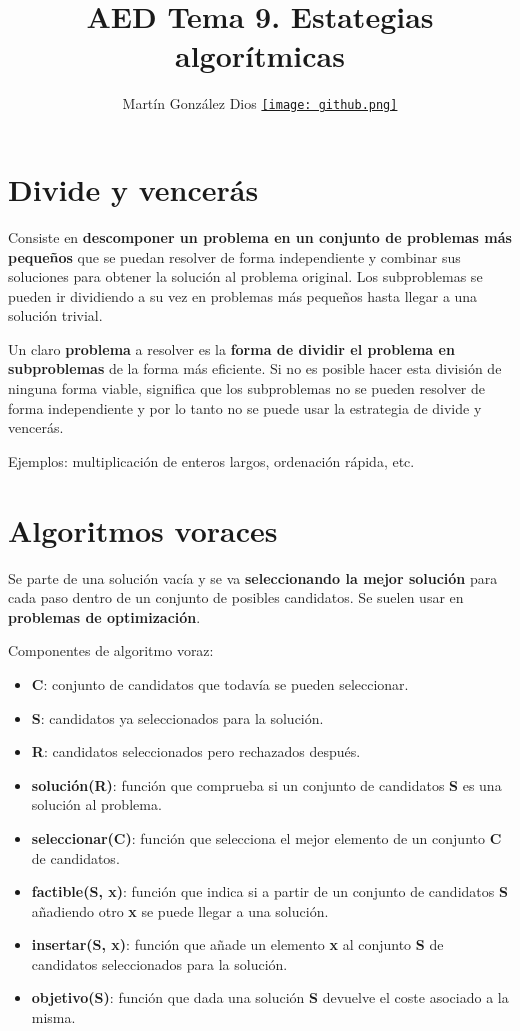 \documentclass{article}
\title{AED Tema 9. Estategias algorítmicas}
\author{Martín González Dios 
\href{https://github.com/martindios}{\texttt{[image: github.png]}}}
\begin{document}
\maketitle

\section{Divide y vencerás}
Consiste en \textbf{descomponer un problema en un conjunto de problemas más pequeños} que se puedan resolver de forma independiente y combinar sus soluciones para obtener la solución al problema original. Los subproblemas se pueden ir dividiendo a su vez en problemas más pequeños hasta llegar a una solución trivial.

Un claro \textbf{problema} a resolver es la \textbf{forma de dividir el problema en subproblemas} de la forma más eficiente. Si no es posible hacer esta división de ninguna forma viable, significa que los subproblemas no se pueden resolver de forma independiente y por lo tanto no se puede usar la
estrategia de divide y vencerás.

Ejemplos: multiplicación de enteros largos, ordenación rápida, etc.

\section{Algoritmos voraces}
Se parte de una solución vacía y se va \textbf{seleccionando la mejor solución} para cada paso dentro
de un conjunto de posibles candidatos. Se suelen usar en \textbf{problemas de optimización}.

Componentes de algoritmo voraz:
\begin{itemize}
    \item \textbf{C}: conjunto de candidatos que todavía se pueden seleccionar.
    \item \textbf{S}: candidatos ya seleccionados para la solución.
    \item \textbf{R}: candidatos seleccionados pero rechazados después.
    \item \textbf{solución(R)}: función que comprueba si un conjunto de candidatos \textbf{S} es una solución al problema. 
    \item \textbf{seleccionar(C)}: función que selecciona el mejor elemento de un conjunto \textbf{C} de candidatos.
    \item \textbf{factible(S, x)}: función que indica si a partir de un conjunto de candidatos \textbf{S} añadiendo otro \textbf{x} se puede llegar a una solución. 
    \item \textbf{insertar(S, x)}: función que añade un elemento \textbf{x} al conjunto \textbf{S} de candidatos seleccionados para la solución.
    \item \textbf{objetivo(S)}: función que dada una solución \textbf{S} devuelve el coste asociado a la misma. 
\end{itemize}
\end{document}
